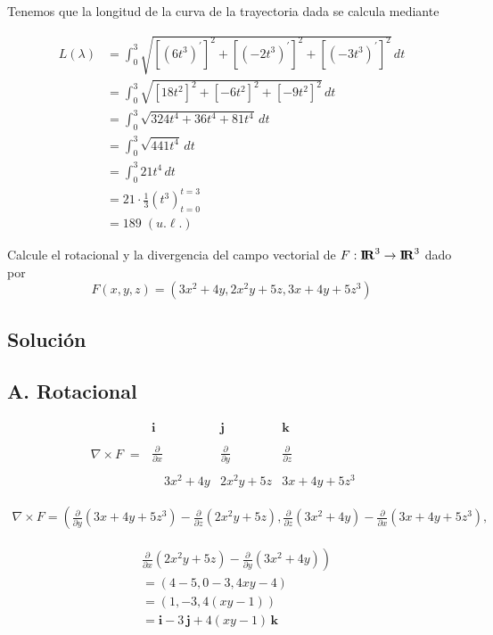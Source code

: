 \documentclass{article}
\begin{document}
Tenemos que la longitud de la curva de la trayectoria dada se calcula mediante

\begin{align*} 
L(\lambda) & =\int_0^3\sqrt{[(6t^3)^{\prime}]^2+[(-2t^3)^{\prime}]^2+[(-3t^3)^{\prime}]^2}\,dt \\ & =\int_0^3\sqrt{[18t^2]^2+[-6t^2]^2+[-9t^2]^2}\,dt \\ 
&=\int_0^3\sqrt{324t^4+36t^4+81t^4}\,dt \\ 
& =\int_0^3\sqrt{441t^4}\,dt \\ & =\int_0^3 21t^4\,dt \\ 
& = 21\cdot\frac13 (t^3)_{t=0}^{t=3} \\ 
& =189 \; (u.\ell.)
\end{align*} \vs

\item Calcule el rotacional y la divergencia del campo vectorial de $F:{\bf I\!R}^3\to {\bf I\!R}^3$ dado por $$F(x,y,z)=(3x^2+4y,2x^2y+5z,3x+4y+5z^3)$$

\subsection*{\bf Solución}

\subsection*{\bf A. Rotacional}

$$\nabla\times F\;=\;\begin{array}{|ccc|}\pmb i  & \pmb j & \pmb k \\  & \phantom{} &  \\ \displaystyle\frac{\partial}{\partial x} & \displaystyle\frac{\partial}{\partial y} & \displaystyle\frac{\partial}{\partial z} \\ &  & \\ \quad 3x^2+4y   & 2x^2y+5z & 3x+4y+5z^3 \quad \end{array} $$

\begin{multline*}
\nabla\times F = \left(\frac{\partial}{ \partial y}(3x+4y+5z^3)-\frac{\partial }{\partial z}(2x^2y+5z), \frac{\partial}{\partial z}(3x^2+4y)-\frac{\partial}{\partial x}(3x+4y+5z^3),\right.
\end{multline*}

\begin{align*}
& \left. \frac{\partial}{\partial x}(2x^2y+5z)-\frac{\partial}{\partial y}(3x^2+4y)\right) \\ 
& =(4-5,0-3,4xy-4) \\ 
& =(1,-3,4(xy-1)) \\ 
& =\pmb{i}-3\,\pmb{j}+4(xy-1)\,\pmb{k} \end{align*}
\end{document}
